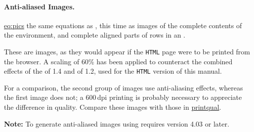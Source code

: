 \paragraph*{Anti-aliased Images.\label{ex:aalias}}
\hyperref{Here are}{Figure~}{ shows}{eq:pics} the same equations
as , this time as images of the 
complete contents of the  environment, 
and complete aligned parts of rows in an .
\begin{latexonly}
These are images, as they would appear if the \texttt{HTML} page
were to be printed from the browser. A scaling of 60\% has been
applied to counteract the combined effects of the  
of 1.4 and  of 1.2, 
used for the \texttt{HTML} version of this manual. 
\end{latexonly}
For a comparison, the second group of images use anti-aliasing effects, 
whereas the first image does not; a 600\,dpi printing is probably necessary
to appreciate the difference in quality. Compare these images with those in
\hyperref{a later section}{Section~}{}{printqual}.

\smallskip\noindent{}
\textbf{Note: }To generate anti-aliased images using  
requires version 4.03 or later.


